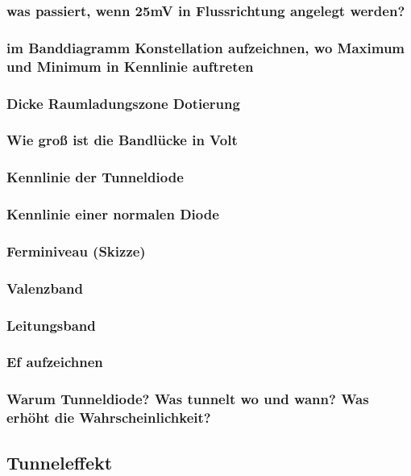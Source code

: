 \documentclass{article}
\begin{document}
    \subsubsection{was passiert, wenn 25mV in Flussrichtung angelegt werden?}
    \subsubsection{im Banddiagramm Konstellation aufzeichnen, wo Maximum und Minimum in Kennlinie auftreten}
    
    \subsubsection{Dicke Raumladungszone Dotierung}
    \subsubsection{Wie groß ist die Bandlücke in Volt}
    \subsubsection{Kennlinie der Tunneldiode}
    \subsubsection{Kennlinie einer normalen Diode}
    
    \subsubsection{Ferminiveau (Skizze)}
    \subsubsection{Valenzband}
    \subsubsection{Leitungsband}
    \subsubsection{Ef aufzeichnen}

    \subsubsection{Warum Tunneldiode? Was tunnelt wo und wann? Was erhöht die Wahrscheinlichkeit?}

\subsection{Tunneleffekt }\label{k5:tunnelEffekt}
\end{document}
